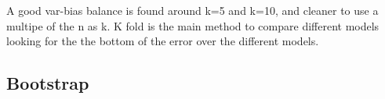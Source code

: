 \documentclass[11pt]{scrartcl} %
\begin{document}
A good var-bias balance is found around k=5 and k=10, and cleaner to use a multipe of the n as k.
K fold is the main method to compare different models looking for the the bottom of the error over the
different models.

\subsection{Bootstrap}








\end{document}
